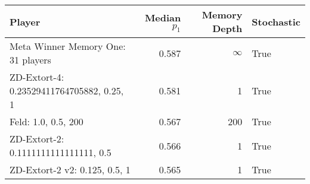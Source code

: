 \begin{tabular}{lrrl}
\toprule
                                    Player &  Median $p_1$ &  Memory Depth & Stochastic \\
\midrule
        Meta Winner Memory One: 31 players &         0.587 &            \(\infty\) &       True \\
 ZD-Extort-4: 0.23529411764705882, 0.25, 1 &         0.581 &             1 &       True \\
                       Feld: 1.0, 0.5, 200 &         0.567 &           200 &       True \\
      ZD-Extort-2: 0.1111111111111111, 0.5 &         0.566 &             1 &       True \\
             ZD-Extort-2 v2: 0.125, 0.5, 1 &         0.565 &             1 &       True \\
\bottomrule
\end{tabular}

